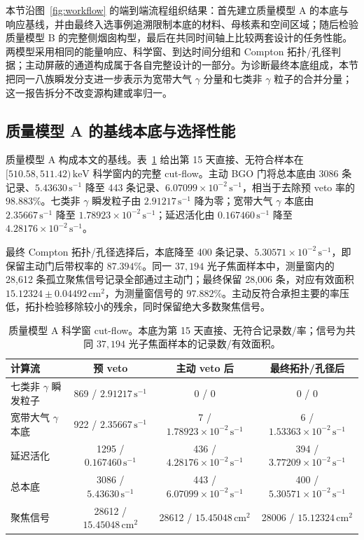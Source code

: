\documentclass[11pt]{article}
\newcommand{\revblue}[1]{\textcolor{revisionblue}{#1}}
\newcommand{\keV}{\,\mathrm{keV}}
\newcommand{\cps}{\,\mathrm{s^{-1}}}
\begin{document}
本节沿图~\ref{fig:workflow} 的端到端流程组织结果：首先建立质量模型 A 的本底与响应基线，并由最终入选事例追溯限制本底的材料、母核素和空间区域；随后检验质量模型 B 的完整侧烟囱构型，最后在共同时间轴上比较两套设计的任务性能。两模型采用相同的能量响应、科学窗、到达时间分组和 Compton 拓扑/孔径判据；主动屏蔽的通道构成属于各自完整设计的一部分。\revblue{为诊断最终本底组成，本节把同一八族瞬发分支进一步表示为宽带大气 $\gamma$ 分量和七类非 $\gamma$ 粒子的合并分量；这一报告拆分不改变源构建或率归一。}

\subsection{质量模型 A 的基线本底与选择性能}
\label{subsec:model_a_baseline_zh}
\label{subsec:reference_background_results_zh}

质量模型 A 构成本文的基线。表~\ref{tab:phase2_cutflow} 给出第 15 天直接、无符合样本在 $[510.58,511.42)\keV$ 科学窗内的完整 cut-flow。主动 BGO 门将总本底由 3086 条记录、$5.43630\cps$ 降至 443 条记录、$6.07099\times10^{-2}\cps$，相当于去除预 veto 率的 $98.883\%$。\revblue{七类非 $\gamma$ 瞬发粒子}由 $2.91217\cps$ 降为零；宽带大气 $\gamma$ 本底由 $2.35667\cps$ 降至 $1.78923\times10^{-2}\cps$；延迟活化由 $0.167460\cps$ 降至 $4.28176\times10^{-2}\cps$。

最终 Compton 拓扑/孔径选择后，本底降至 400 条记录、$5.30571\times10^{-2}\cps$，即保留主动门后带权率的 $87.394\%$。同一 $37{,}194$ 光子焦面样本中，测量窗内的 28,612 条孤立聚焦信号记录全部通过主动门；最终保留 28,006 条，对应有效面积 $15.12324\pm0.04492\,\mathrm{cm^2}$，为测量窗信号的 $97.882\%$。主动反符合承担主要的率压低，拓扑检验移除较小的残余，同时保留绝大多数聚焦信号。

\begin{table}[H]
\centering
\caption{质量模型 A 科学窗 cut-flow。本底为第 15 天直接、无符合记录数/率；信号为共同 $37{,}194$ 光子焦面样本的记录数/有效面积。}
\label{tab:phase2_cutflow}
\footnotesize
\begin{tabular}{lccc}
\toprule
计算流 & 预 veto & 主动 veto 后 & 最终拓扑/孔径后 \\
\midrule
\revblue{七类非 $\gamma$ 瞬发粒子} & 869 / $2.91217\cps$ & 0 / 0 & 0 / 0 \\
宽带大气 $\gamma$ 本底 & 922 / $2.35667\cps$ & 7 / $1.78923\times10^{-2}\cps$ & 6 / $1.53363\times10^{-2}\cps$ \\
延迟活化 & 1295 / $0.167460\cps$ & 436 / $4.28176\times10^{-2}\cps$ & 394 / $3.77209\times10^{-2}\cps$ \\
总本底 & 3086 / $5.43630\cps$ & 443 / $6.07099\times10^{-2}\cps$ & 400 / $5.30571\times10^{-2}\cps$ \\
聚焦信号 & 28612 / $15.45048\,\mathrm{cm^2}$ & 28612 / $15.45048\,\mathrm{cm^2}$ & 28006 / $15.12324\,\mathrm{cm^2}$ \\
\bottomrule
\end{tabular}
\end{table}
\end{document}
